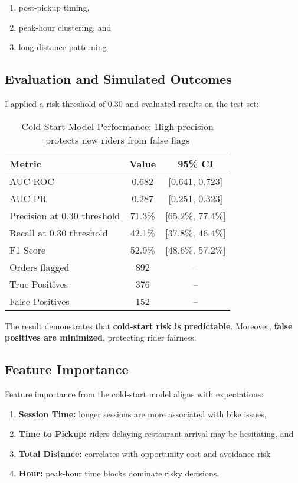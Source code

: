 \begin{enumerate}
    \item post-pickup timing,
    \item peak-hour clustering, and
    \item long-distance patterning
\end{enumerate}

\subsection{Evaluation and Simulated Outcomes}

I applied a risk threshold of 0.30 and evaluated results on the test set:

\begin{table}[H]
\centering
\caption{Cold-Start Model Performance: High precision protects new riders from false flags}
\label{tab:coldstart_performance}
\begin{tabular}{lcc}
\toprule
Metric & Value & 95\% CI \\
\midrule
AUC-ROC & 0.682 & [0.641, 0.723] \\
AUC-PR & 0.287 & [0.251, 0.323] \\
Precision at 0.30 threshold & 71.3\% & [65.2\%, 77.4\%] \\
Recall at 0.30 threshold & 42.1\% & [37.8\%, 46.4\%] \\
F1 Score & 52.9\% & [48.6\%, 57.2\%] \\
Orders flagged & 892 & -- \\
True Positives & 376 & -- \\
False Positives & 152 & -- \\
\bottomrule
\end{tabular}
\end{table}

The result demonstrates that \textbf{cold-start risk is predictable}. Moreover, \textbf{false positives are minimized}, protecting rider fairness.

\subsection{Feature Importance}

Feature importance from the cold-start model aligns with expectations:

\begin{enumerate}
    \item \textbf{Session Time:} longer sessions are more associated with bike issues,
    \item \textbf{Time to Pickup:} riders delaying restaurant arrival may be hesitating, and
    \item \textbf{Total Distance:} correlates with opportunity cost and avoidance risk
    \setcounter{enumi}{3}
    \item \textbf{Hour:} peak-hour time blocks dominate risky decisions.
\end{enumerate}

